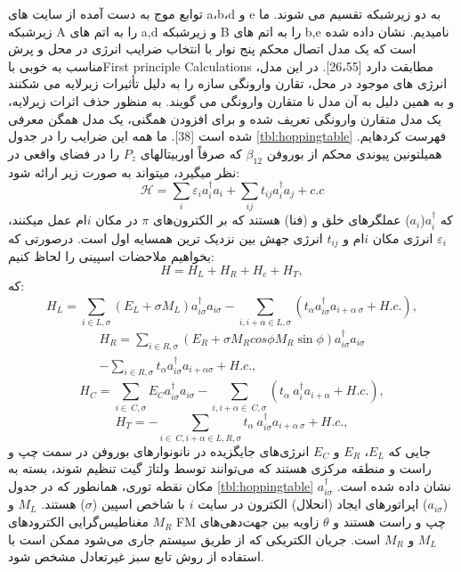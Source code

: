 توابع موج به دست آمده از سایت های a،b،d و e به دو زیرشبکه تقسیم می شوند. ما زیرشبکه A را به اتم های a,d و زیرشبکه B را به اتم های b,e نامیدیم. نشان داده شده است که یک مدل اتصال محکم پنج نوار با انتخاب ضرایب انرژی در محل و پرش مناسب به خوبی با\gls{First principle Calculations} مطابقت دارد [26،55]. در این مدل، انرژی های موجود در محل، تقارن وارونگی سازه را به دلیل تأثیرات زیرلایه  می شکنند و به همین دلیل به آن مدل نا متقارن وارونگی  می گویند. به منظور حذف اثرات زیرلایه، یک مدل متقارن وارونگی  تعریف شده و برای افزودن همگنی، یک مدل همگن معرفی شده است [38]. ما همه این ضرایب را در جدول \ref{tbl:hoppingtable} فهرست کردهایم. همیلتونین پیوندی محکم از بوروفن $\beta_{12}$ که صرفاً اوربیتالهای $P_z$ را در فضای واقعی در نظر میگیرد، میتواند به صورت زیر ارائه شود:
\begin{equation}
  \mathcal{H}=\sum_{i}\varepsilon_i a_i^\dagger a_i +\sum_{ij} t_{ij}a_i^\dagger a_j+c.c
\end{equation}
که $a_i^\dagger$($a_i$) عملگرهای خلق و (فنا) هستند که بر الکترون‌های $\pi$ در مکان $i$ام عمل میکنند، $\varepsilon_i$ انرژی مکان $i$ام و $t_{ij}$ انرژی جهش بین نزدیک ترین همسایه اول است.
درصورتی که بخواهیم ملاحضات اسپینی را لحاظ کنیم:
\begin{equation}
  H= H_L + H_R + H_c + H_T,
\end{equation}
که:
\begin{equation}
H_{L}=\sum\limits_{i\in L,\sigma }{\left( E_{L}+\sigma M_{L} \right)} a_{i\sigma }^{\dagger} a_{i\sigma }-\sum\limits_{i,i+\alpha \in L,\sigma}{\left( t_{\alpha } a_{i\sigma}^{\dagger} a_{i+\alpha \ \sigma }+H.c.\right)},
\end{equation}
\begin{equation}
\begin{split}
H_{R}=\sum_{i\in R,\sigma}{\left( E_{R}+\sigma M_{R} cos\phi M_{R}\sin \phi\right)} a_{i\sigma}^{\dagger} a_{i\sigma } \\
-\sum_{i\in R,\sigma} t_{\alpha } a_{i\sigma}^{\dagger} a_{i+\alpha\sigma}+H.c.,
\end{split}
\end{equation}
\begin{equation}
H_{C}=\sum_{i\in \ C,\sigma }{{{E}_{C}}}a_{i\sigma }^{\dagger}{{a}_{i\sigma }}-\sum_{i,i+\alpha \in \ C,\sigma }{({{t}_{\alpha }}\ a_{i}^{\dagger }{{a}_{i+\alpha }}+H.c.)},
\end{equation}
\begin{equation}
H_{T}=-\sum_{i\in \ C,i+\alpha \in L,R,\sigma}{{{t}_{\alpha }}}\ a_{i\sigma }^{\dagger }{{a}_{i+\alpha \ \sigma }}+H.c.,
\end{equation}
جایی که $E_L$، $E_R$ و $E_C$ انرژی‌های جایگزیده در نانونوارهای بوروفن در سمت چپ و راست و منطقه مرکزی هستند که می‌توانند توسط ولتاژ گیت تنظیم شوند، بسته به مکان نقطه توری، همانطور که در جدول \ref{tbl:hoppingtable} نشان داده شده است. $a^{\dagger}_{i\sigma}$ ($a_{i\sigma}$) اپراتورهای ایجاد (انحلال) الکترون در سایت $i$ با شاخص اسپین ($\sigma$) هستند. $M_L$ و $M_R$ مغناطیس‌گرایی الکترودهای FM چپ و راست هستند و $\theta$ زاویه بین جهت‌دهی‌های $M_L$ و $M_R$ است. جریان الکتریکی که از طریق سیستم جاری می‌شود ممکن است با استفاده از روش تابع سبز غیرتعادل مشخص شود.

